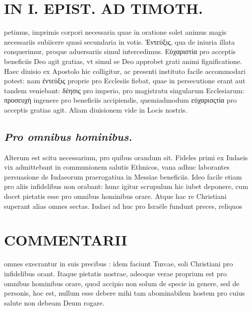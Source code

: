 \documentclass{article}
\begin{document}
\begin{pages}
\section*{IN I. EPIST. AD TIMOTH. }
\marginpar{[ p.45 ]}\pstart petimus, imprimis corpori necessaria quae in oratione solet animus magis necessariis subiicere quasi secundaria in votis.  \pend\pstart Ἐντεύξις, qua de iniuria illata conquerimur, proque aduersariis simul intercedimus. Εὐχαριστία pro acceptis beneficiis Deo agit gratias, vt simul se Deo approbet grati animi fignificatione. Haec diuisio ex Apostolo hic colligitur, ac presenti instituto facile accommodari potest: nam ἐντεύξις proprie pro Ecclesiis fiebat, quae in persecutione erant aut tandem veniebant: δέησις pro imperio, pro magistratu singularum Ecclesiarum: προσευχὴ ingenere pro beneficiis accipiendis, quemiadmodum εὐχαρισςτία pro acceptis gratias agit. Aliam diuisionem vide in Locis nostris.  \pend
{}
{}
\subsection*{\textit{Pro omnibus hominibus. }}\pstart Alterum est scitu necessarium, pro quibus orandum sit. Fideles primi ex Iudaeis vix admittebant in communionem salutis Ethnicos, vana adhuc laborantes persuasione de Iudaeorum praerogatiua in Messiae beneficiis. Ideo facile etiam pro aliis infidelibus non orabant: hunc igitur scrupulum hic iubet deponere, cum docet pietatis esse pro omnibus hominibus orare. Atque hac re Christiani superant alias omnes sectas. Iudaei ad huc pro Israële fundunt preces, reliquos  \pend
\section*{COMMENTARII }
\marginpar{[ p.46 ]}\pstart omnes execrantur in suis precibus : idem faciunt Turcae, soli Christiani pro infidelibus orant. Itaque pietatis nostrae, adeoque verae proprium est pro omnibus hominibus orare, quod accipio non solum de specie in genere, sed de personis, hoc est, nullum esse debere mihi tam abominabilem hostem pro cuius salute non debeam Deum rogare.  \pend
{}
{}

\end{pages}
\end{document}
